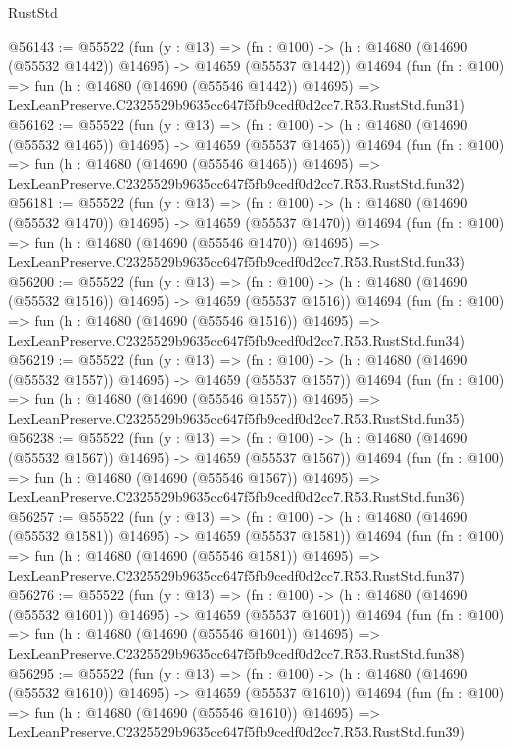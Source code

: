 \begin{lexlean}{RustStd}
\begin{coremodule}
@56143 := @55522
    (fun (y : @13) =>
    (fn : @100) -> (h : @14680 (@14690 (@55532 @1442)) @14695) -> @14659 (@55537 @1442))
    @14694
    (fun (fn : @100) =>
    fun (h : @14680 (@14690 (@55546 @1442)) @14695) =>
    LexLeanPreserve.C2325529b9635cc647f5fb9cedf0d2cc7.R53.RustStd.fun31)
@56162 := @55522
    (fun (y : @13) =>
    (fn : @100) -> (h : @14680 (@14690 (@55532 @1465)) @14695) -> @14659 (@55537 @1465))
    @14694
    (fun (fn : @100) =>
    fun (h : @14680 (@14690 (@55546 @1465)) @14695) =>
    LexLeanPreserve.C2325529b9635cc647f5fb9cedf0d2cc7.R53.RustStd.fun32)
@56181 := @55522
    (fun (y : @13) =>
    (fn : @100) -> (h : @14680 (@14690 (@55532 @1470)) @14695) -> @14659 (@55537 @1470))
    @14694
    (fun (fn : @100) =>
    fun (h : @14680 (@14690 (@55546 @1470)) @14695) =>
    LexLeanPreserve.C2325529b9635cc647f5fb9cedf0d2cc7.R53.RustStd.fun33)
@56200 := @55522
    (fun (y : @13) =>
    (fn : @100) -> (h : @14680 (@14690 (@55532 @1516)) @14695) -> @14659 (@55537 @1516))
    @14694
    (fun (fn : @100) =>
    fun (h : @14680 (@14690 (@55546 @1516)) @14695) =>
    LexLeanPreserve.C2325529b9635cc647f5fb9cedf0d2cc7.R53.RustStd.fun34)
@56219 := @55522
    (fun (y : @13) =>
    (fn : @100) -> (h : @14680 (@14690 (@55532 @1557)) @14695) -> @14659 (@55537 @1557))
    @14694
    (fun (fn : @100) =>
    fun (h : @14680 (@14690 (@55546 @1557)) @14695) =>
    LexLeanPreserve.C2325529b9635cc647f5fb9cedf0d2cc7.R53.RustStd.fun35)
@56238 := @55522
    (fun (y : @13) =>
    (fn : @100) -> (h : @14680 (@14690 (@55532 @1567)) @14695) -> @14659 (@55537 @1567))
    @14694
    (fun (fn : @100) =>
    fun (h : @14680 (@14690 (@55546 @1567)) @14695) =>
    LexLeanPreserve.C2325529b9635cc647f5fb9cedf0d2cc7.R53.RustStd.fun36)
@56257 := @55522
    (fun (y : @13) =>
    (fn : @100) -> (h : @14680 (@14690 (@55532 @1581)) @14695) -> @14659 (@55537 @1581))
    @14694
    (fun (fn : @100) =>
    fun (h : @14680 (@14690 (@55546 @1581)) @14695) =>
    LexLeanPreserve.C2325529b9635cc647f5fb9cedf0d2cc7.R53.RustStd.fun37)
@56276 := @55522
    (fun (y : @13) =>
    (fn : @100) -> (h : @14680 (@14690 (@55532 @1601)) @14695) -> @14659 (@55537 @1601))
    @14694
    (fun (fn : @100) =>
    fun (h : @14680 (@14690 (@55546 @1601)) @14695) =>
    LexLeanPreserve.C2325529b9635cc647f5fb9cedf0d2cc7.R53.RustStd.fun38)
@56295 := @55522
    (fun (y : @13) =>
    (fn : @100) -> (h : @14680 (@14690 (@55532 @1610)) @14695) -> @14659 (@55537 @1610))
    @14694
    (fun (fn : @100) =>
    fun (h : @14680 (@14690 (@55546 @1610)) @14695) =>
    LexLeanPreserve.C2325529b9635cc647f5fb9cedf0d2cc7.R53.RustStd.fun39)

\end{coremodule}
\end{lexlean}
